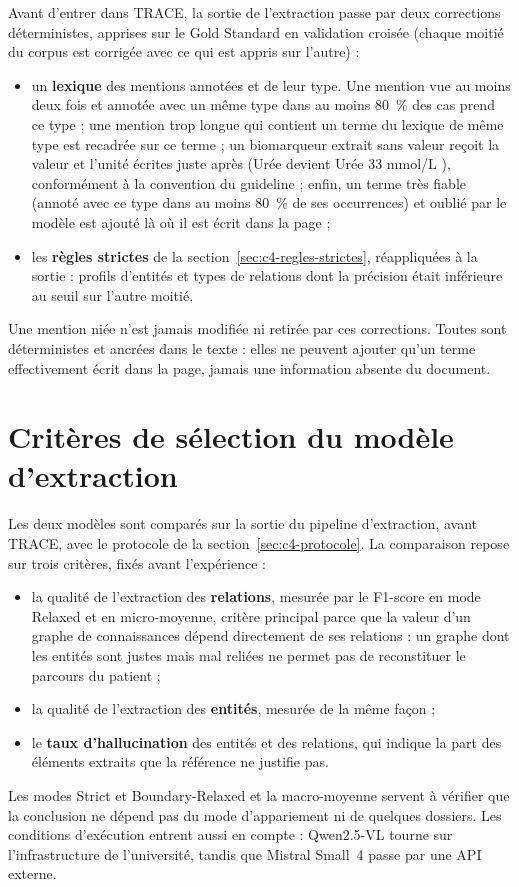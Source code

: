 Avant d'entrer dans TRACE, la sortie de l'extraction passe par deux corrections déterministes, apprises sur le Gold Standard en validation croisée (chaque moitié du corpus est corrigée avec ce qui est appris sur l'autre) :
\begin{itemize}
  \item un \textbf{lexique} des mentions annotées et de leur type. Une mention vue au moins deux fois et annotée avec un même type dans au moins 80~\% des cas prend ce type ; une mention trop longue qui contient un terme du lexique de même type est recadrée sur ce terme ; un biomarqueur extrait sans valeur reçoit la valeur et l'unité écrites juste après (\og Urée \fg{} devient \og Urée 33 mmol/L \fg{}), conformément à la convention du guideline ; enfin, un terme très fiable (annoté avec ce type dans au moins 80~\% de ses occurrences) et oublié par le modèle est ajouté là où il est écrit dans la page ;
  \item les \textbf{règles strictes} de la section~\ref{sec:c4-regles-strictes}, réappliquées à la sortie : profils d'entités et types de relations dont la précision était inférieure au seuil sur l'autre moitié.
\end{itemize}
Une mention niée n'est jamais modifiée ni retirée par ces corrections. Toutes sont déterministes et ancrées dans le texte : elles ne peuvent ajouter qu'un terme effectivement écrit dans la page, jamais une information absente du document.

\section{Critères de sélection du modèle d'extraction}\label{sec:c4-selection}

Les deux modèles sont comparés sur la sortie du pipeline d'extraction, avant TRACE, avec le protocole de la section~\ref{sec:c4-protocole}. La comparaison repose sur trois critères, fixés avant l'expérience :
\begin{itemize}
  \item la qualité de l'extraction des \textbf{relations}, mesurée par le F1-score en mode Relaxed et en micro-moyenne, critère principal parce que la valeur d'un graphe de connaissances dépend directement de ses relations : un graphe dont les entités sont justes mais mal reliées ne permet pas de reconstituer le parcours du patient ;
  \item la qualité de l'extraction des \textbf{entités}, mesurée de la même façon ;
  \item le \textbf{taux d'hallucination} des entités et des relations, qui indique la part des éléments extraits que la référence ne justifie pas.
\end{itemize}
Les modes Strict et Boundary-Relaxed et la macro-moyenne servent à vérifier que la conclusion ne dépend pas du mode d'appariement ni de quelques dossiers. Les conditions d'exécution entrent aussi en compte : Qwen2.5-VL tourne sur l'infrastructure de l'université, tandis que Mistral Small~4 passe par une API externe.

